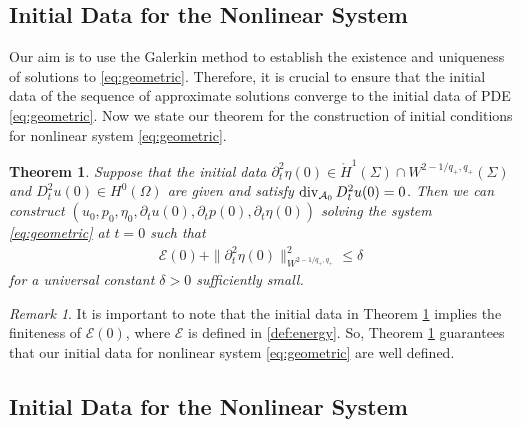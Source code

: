\documentclass[letterpaper,reqno,10pt,twoside]{amsart}
\makeatletter
\renewcommand \theequation {%
	\ifnum \c@section>\z@ \@arabic\c@section.%
	\fi\@arabic\c@equation} \@addtoreset{equation}{section}
\newtheorem{theorem}{Theorem}[section]
\theoremstyle{definition}
\theoremstyle{remark}
\newtheorem{remark}{Remark}[section]
\def\p{\partial}
\def\Om{\Omega}
\def\dive{\mathop{\rm div}\nolimits}
\makeatother
\begin{document}
\begin{appendix}
			\makeatletter
			\renewcommand \theequation {%
				B.%
				\@arabic\c@equation} 
			\makeatother
			
			
			\section{Initial Data for the Nonlinear System}\label{sec:initial}
			
			
			Our aim is to use the Galerkin method to establish the existence and uniqueness of solutions to \eqref{eq:geometric}. Therefore, it is crucial to ensure that the initial data of the sequence of approximate solutions converge to the initial data of PDE \eqref{eq:geometric}.
			Now we state our theorem for the construction of initial conditions for nonlinear system \eqref{eq:geometric}.
			\begin{theorem}\label{thm:initial}
				Suppose that the initial data $\p_t^2\eta(0)\in \mathring{H}^1(\Sigma)\cap W^{2-1/q_+, q_+}(\Sigma)$ and $ D_t^2u(0)\in H^0(\Om)$ are given and satisfy $\dive_{\mathcal{A}_0}D_t^2u(0)=0$. Then we can  construct $(u_0, p_0, \eta_0, \p_tu(0), \p_tp(0), \p_t\eta(0))$
				solving the system \eqref{eq:geometric} at $t=0$ such that
				\begin{align}
					\mathcal{E}(0) + \|\p_t^2\eta(0)\|_{W^{2-1/q_+, q_+}}^2\le \delta
				\end{align}
				for a universal constant $\delta>0$ sufficiently small.
			\end{theorem}
			
			\begin{remark}
				It is important to note that the initial data in Theorem \ref{thm:initial} implies the finiteness of $\mathcal{E}(0)$, where $\mathcal{E}$ is defined in \eqref{def:energy}. So, Theorem \ref{thm:initial} guarantees that our initial data for nonlinear system \eqref{eq:geometric} are well defined.
			\end{remark}
			
			
			\subsection{Initial Data for the Nonlinear System}\label{sec:initial_linear}
			

\end{appendix}
\end{document}
